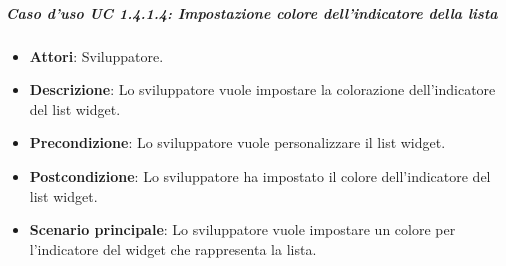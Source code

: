 \subparagraph{Caso d'uso UC 1.4.1.4: Impostazione colore dell'indicatore della lista}

\FloatBarrier
\begin{itemize}
\item\textbf{Attori}: Sviluppatore.
\item\textbf{Descrizione}: Lo sviluppatore vuole impostare la colorazione dell'indicatore del list widget.
\item\textbf{Precondizione}: Lo sviluppatore vuole personalizzare il list widget.
\item\textbf{Postcondizione}: Lo sviluppatore ha impostato il colore dell'indicatore del list widget.
\item\textbf{Scenario principale}: Lo sviluppatore vuole impostare un colore per l'indicatore del widget che rappresenta la lista.
\end{itemize}